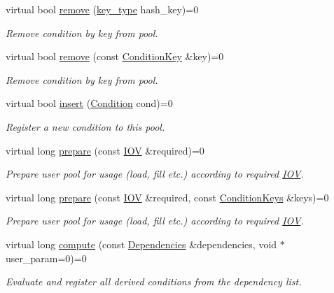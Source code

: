 \begin{DoxyCompactItemize}
virtual bool \hyperlink{class_d_d4hep_1_1_conditions_1_1_user_pool_aeab574005dcfb99f8147b87d220f65f1}{remove} (\hyperlink{class_d_d4hep_1_1_conditions_1_1_user_pool_aa256cf1e22de1b9f2a84d39309b8bfa9}{key\+\_\+type} hash\+\_\+key)=0
\begin{DoxyCompactList}\small\item\em Remove condition by key from pool. \end{DoxyCompactList}\item 
virtual bool \hyperlink{class_d_d4hep_1_1_conditions_1_1_user_pool_ac8f9ef22b7ec455e7ab56d05dc43af77}{remove} (const \hyperlink{class_d_d4hep_1_1_conditions_1_1_condition_key}{Condition\+Key} \&key)=0
\begin{DoxyCompactList}\small\item\em Remove condition by key from pool. \end{DoxyCompactList}\item 
virtual bool \hyperlink{class_d_d4hep_1_1_conditions_1_1_user_pool_af25760694df2897b8998fcf65ced5a18}{insert} (\hyperlink{class_d_d4hep_1_1_conditions_1_1_condition}{Condition} cond)=0
\begin{DoxyCompactList}\small\item\em Register a new condition to this pool. \end{DoxyCompactList}\item 
virtual long \hyperlink{class_d_d4hep_1_1_conditions_1_1_user_pool_aebbb5c871d30372eb33955aef9bfcaf0}{prepare} (const \hyperlink{class_d_d4hep_1_1_i_o_v}{I\+OV} \&required)=0
\begin{DoxyCompactList}\small\item\em Prepare user pool for usage (load, fill etc.) according to required \hyperlink{class_d_d4hep_1_1_i_o_v}{I\+OV}. \end{DoxyCompactList}\item 
virtual long \hyperlink{class_d_d4hep_1_1_conditions_1_1_user_pool_a91ce4579b205b59ef3012b8b97013abf}{prepare} (const \hyperlink{class_d_d4hep_1_1_i_o_v}{I\+OV} \&required, const \hyperlink{class_d_d4hep_1_1_conditions_1_1_user_pool_a6282d01af77401a4c20f08391d18cc95}{Condition\+Keys} \&keys)=0
\begin{DoxyCompactList}\small\item\em Prepare user pool for usage (load, fill etc.) according to required \hyperlink{class_d_d4hep_1_1_i_o_v}{I\+OV}. \end{DoxyCompactList}\item 
virtual long \hyperlink{class_d_d4hep_1_1_conditions_1_1_user_pool_a117faa4219d68ba50835ac691b538b08}{compute} (const \hyperlink{class_d_d4hep_1_1_conditions_1_1_user_pool_a0da9a8bee4190e4deebf83102902118d}{Dependencies} \&dependencies, void $\ast$user\+\_\+param=0)=0
\begin{DoxyCompactList}\small\item\em Evaluate and register all derived conditions from the dependency list. \end{DoxyCompactList}\end{DoxyCompactItemize}
